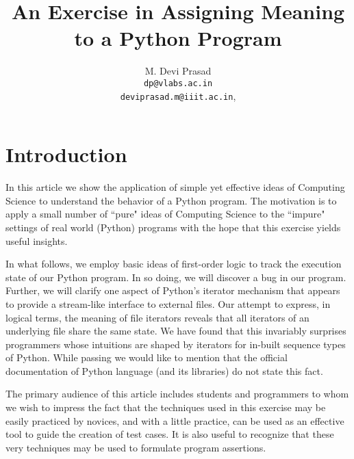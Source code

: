 \documentclass[10pt, a4paper]{article}
\begin{document}
\title{An Exercise in Assigning Meaning to a Python Program}
\author{M. Devi Prasad\vspace*{1.5mm}\\\texttt{dp@vlabs.ac.in}\\\texttt{deviprasad.m@iiit.ac.in},}
\date{}
\maketitle


\section{Introduction}
In this article we show the application of simple yet effective ideas of Computing Science to understand the behavior of a Python program. The motivation is to apply a small number of ``pure" ideas of Computing Science to the ``impure" settings of real world (Python) programs with the hope that this exercise yields useful insights.

In what follows, we employ basic ideas of first-order logic to track the execution state of our Python program. In so doing, we will discover a bug in our program. Further, we will clarify one aspect of Python's iterator mechanism that appears to provide a stream-like interface to external files. Our attempt to express, in logical terms, the meaning of file iterators reveals that all iterators of an underlying file share the same state. We have found that this invariably surprises programmers whose intuitions are shaped by iterators for in-built sequence types of Python. While passing we would like to mention that the official documentation of Python language (and its libraries) do not state this fact.

The primary audience of this article includes students and programmers to whom we wish to impress the fact that the techniques used in this exercise may be easily practiced by novices, and with a little practice, can be used as an effective tool to guide the creation of test cases. It is also useful to recognize that these very techniques may be used to formulate program assertions.  
\end{document}
